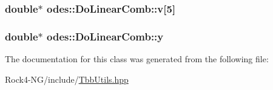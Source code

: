 \hypertarget{classodes_1_1DoLinearComb_a0375d94ddde01ef97012bc854f178c21}{
\subsubsection[{v}]{\setlength{\rightskip}{0pt plus 5cm}double$\ast$ odes\-::\-Do\-Linear\-Comb\-::v\mbox{[}5\mbox{]}\hspace{0.3cm}{\ttfamily [private]}}}\label{classodes_1_1DoLinearComb_a0375d94ddde01ef97012bc854f178c21}
\hypertarget{classodes_1_1DoLinearComb_aae38a367a81194099c5d3a36696f071e}{
\subsubsection[{y}]{\setlength{\rightskip}{0pt plus 5cm}double$\ast$ odes\-::\-Do\-Linear\-Comb\-::y\hspace{0.3cm}{\ttfamily [private]}}}\label{classodes_1_1DoLinearComb_aae38a367a81194099c5d3a36696f071e}


The documentation for this class was generated from the following file\-:\begin{DoxyCompactItemize}
\item 
Rock4-\/\-N\-G/include/\hyperlink{TbbUtils_8hpp}{Tbb\-Utils.\-hpp}\end{DoxyCompactItemize}
